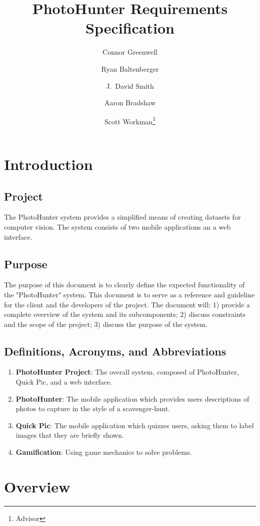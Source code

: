 \documentclass{article}
\title{PhotoHunter Requirements Specification
}
\author{Connor Greenwell \and Ryan Baltenberger 
  \and J.\ David Smith \and Aaron Bradshaw
  \and Scott Workman\footnote{Advisor}}
\begin{document}
\maketitle

\section{Introduction}
\subsection{Project}
The PhotoHunter system provides a simplified means of creating datasets for computer vision. The system consists of two mobile applications an a web interface. 

\subsection{Purpose}
The purpose of this document is to clearly define the expected functionality of the "PhotoHunter" system. This document is to serve as a reference and guideline for the client and the developers of the project. The document will: 1) provide a complete overview of the system and its subcomponents; 2) discuss constraints and the scope of the project; 3) discuss the purpose of the system. 

\subsection{Definitions, Acronyms, and Abbreviations}

\begin{enumerate}

\item\textbf{PhotoHunter Project}: The overall system, composed of PhotoHunter, Quick Pic, and a web interface.
\item\textbf{PhotoHunter}: The mobile application which provides users descriptions of photos to capture in the style of a scavenger-hunt. 
\item\textbf{Quick Pic}: The mobile application which quizzes users, asking them to label images that they are briefly shown.
\item\textbf{Gamification}: Using game mechanics to solve problems.
\end{enumerate}

\section{Overview}
\end{document}
